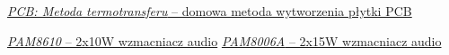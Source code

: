\documentclass[12pt]{report}
\begin{document}
\begin{thebibliography}{9}
		\href{http://mikrokontrolery.blogspot.com/2011/03/wykonanie-plytki-pcb-metoda-termotransferu.html}{\textit{PCB: Metoda termotransferu} -- domowa metoda wytworzenia płytki PCB}
		
		\href{https://www.diodes.com/assets/Datasheets/products_inactive_data/PAM8610.pdf}{\textit{PAM8610} -- 2x10W wzmacniacz audio}
		\href{https://www.diodes.com/assets/Datasheets/PAM8006A.pdf}{\textit{PAM8006A} -- 2x15W wzmacniacz audio}
		
	\end{thebibliography}
	
\end{document}
